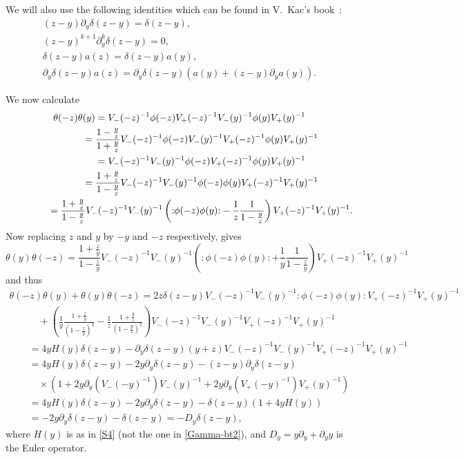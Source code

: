 \documentclass[11pt]{article}
\numberwithin{equation}{section}
\begin{document}
We will also use the
following identities which can be found in V.~Kac's book~\cite{KacVAfB}:
\begin{gather*}
(z-y)\partial_y\delta(z-y) =\delta(z-y), \\
(z-y)^{k+1}\partial_y^{k}\delta(z-y) =0, \\
\delta(z-y)a(z) =\delta(z-y)a(y), \\
\partial_y\delta(z-y)a(z) =\partial_y\delta(z-y)\left(a(y)+(z-y)\partial_ya(y)\right).
\end{gather*}

We now calculate
\begin{gather*}
\theta(-z)\theta(y) =V_-(-z)^{-1}\phi(-z)V_+(-z)^{-1}V_-(y)^{-1}\phi(y)V_+(y)^{-1}\\
\hphantom{\theta(-z)\theta(y)}{} =\frac{1-\frac{y}{z}}{1+\frac{y}{z}}
V_-(-z)^{-1}\phi(-z)V_-(y)^{-1}V_+(-z)^{-1}\phi(y)V_+(y)^{-1}\\
\hphantom{\theta(-z)\theta(y)}{}=V_-(-z)^{-1}V_-(y)^{-1}\phi(-z)V_+(-z)^{-1}\phi(y)V_+(y)^{-1}\\
\hphantom{\theta(-z)\theta(y)}{} =\frac{1+\frac{y}{z}}{1-\frac{y}{z}}
V_-(-z)^{-1}V_-(y)^{-1}\phi(-z)\phi(y)V_+(-z)^{-1}V_+(y)^{-1}\\
\hphantom{\theta(-z)\theta(y)}{} =\frac{1+\frac{y}{z}}{1-\frac{y}{z}}
V_-(-z)^{-1}V_-(y)^{-1}\left({:}\phi(-z)\phi(y){:}-\frac{1}{z}\frac{1}{1-\frac{y}{z}}\right)
V_+(-z)^{-1}V_+(y)^{-1}.
\end{gather*}
Now replacing $z$ and $y$ by $-y$ and $-z$ respectively, gives
\[
\theta(y)\theta(-z)=\frac{1+\frac{z}{y}}{1-\frac{z}{y}}
V_-(-z)^{-1}V_-(y)^{-1}\left({:}\phi(-z)\phi(y){:}+\frac{1}{y}\frac{1}{1-\frac{z}{y}}\right)
V_+(-z)^{-1}V_+(y)^{-1}
\]
and thus
 \begin{gather}
 \theta(-z)\theta(y)+\theta(y)\theta(-z)
=
2z\delta(z-y)V_-(-z)^{-1}V_-(y)^{-1}{:}\phi(-z)\phi(y){:}
V_+(-z)^{-1}V_+(y)^{-1}\nonumber\\
\qquad\quad{} + \left( \frac 1y \frac{1+\frac{z}{y}}{(1-\frac{z}{y})^2}-\frac
1z \frac{1+\frac{y}{z}}{(1-\frac{y}{z})^2}\right)
V_-(-z)^{-1}V_-(y)^{-1} V_+(-z)^{-1}V_+(y)^{-1}\nonumber\\
\qquad {}
= 4yH(y)\delta(z-y)-\partial_y\delta(z-y)(y+z)V_-(-z)^{-1}V_-(y)^{-1}
V_+(-z)^{-1}V_+(y)^{-1}\nonumber\\
\qquad {}
= 4yH(y)\delta(z-y)-2y\partial_y\delta(z-y)
-(z-y)\partial_y\delta(z-y) \nonumber\\
\qquad\quad{}
 \times\left(1+2y\partial_y\left(V_-(-y)^{-1}\right)V_-(y)^{-1}
+2y\partial_y\left(V_+(-y)^{-1}\right)V_+(y)^{-1}\right)\nonumber\\
\qquad {}
= 4yH(y)\delta(z-y)-2y\partial_y\delta(z-y)-
\delta(z-y)\left(1+4yH(y)\right)\nonumber\\
\qquad {}
= {-2}y\partial_y\delta(z-y)-\delta(z-y)=-D_y\delta(z-y) ,\label{thetatheta-equality}
\end{gather}
where $H(y)$ is as in \eqref{S4} (not the one in \eqref{Gamma-bt2}),
and $D_y=y\partial_y+\partial_y y$ is the Euler operator.
\end{document}
